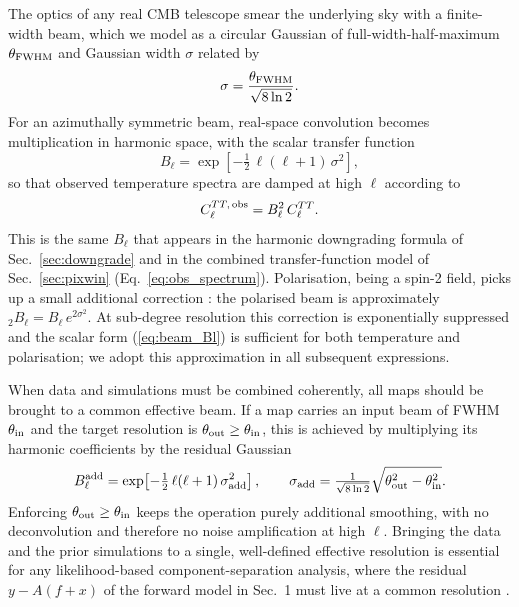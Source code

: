 \documentclass[11pt]{article}
\theoremstyle{definition}
\begin{document}
The optics of any real CMB telescope smear the underlying sky with a finite-width beam, which we model as a circular Gaussian of full-width-half-maximum \(\theta_{\rm FWHM}\) and Gaussian width \(\sigma\) related by \cite{sullivan2024methods}
\begin{equation}
  \sigma = \frac{\theta_{\rm FWHM}}{\sqrt{8\ln 2}}.
\end{equation}
For an azimuthally symmetric beam, real-space convolution becomes multiplication in harmonic space, with the scalar transfer function
\begin{equation}
  B_\ell = \exp\!\left[-\tfrac{1}{2}\,\ell(\ell+1)\,\sigma^2\right],
  \label{eq:beam_Bl}
\end{equation}
so that observed temperature spectra are damped at high \(\ell\) according to
\begin{equation}
  C_\ell^{TT,\,\rm obs} = B_\ell^2\, C_\ell^{TT}.
\end{equation}
This is the same $B_\ell$ that appears in the harmonic downgrading formula of Sec.~\ref{sec:downgrade} and in the combined transfer-function model of Sec.~\ref{sec:pixwin} (Eq.~\ref{eq:obs_spectrum}).
Polarisation, being a spin-2 field, picks up a small additional correction \cite{challinor2000beam,sullivan2024methods}: the polarised beam is approximately \({}_2 B_\ell = B_\ell\,e^{2\sigma^2}\). At sub-degree resolution this correction is exponentially suppressed and the scalar form (\ref{eq:beam_Bl}) is sufficient for both temperature and polarisation; we adopt this approximation in all subsequent expressions.

When data and simulations must be combined coherently, all maps should be brought to a common effective beam. If a map carries an input beam of FWHM \(\theta_{\rm in}\) and the target resolution is \(\theta_{\rm out}\geq\theta_{\rm in}\), this is achieved by multiplying its harmonic coefficients by the residual Gaussian
\begin{equation}
  B_\ell^{\rm add}
  = \exp\!\left[-\tfrac{1}{2}\,\ell(\ell+1)\,\sigma_{\rm add}^2\right],
  \qquad
  \sigma_{\rm add} = \tfrac{1}{\sqrt{8\ln 2}}\sqrt{\theta_{\rm out}^2-\theta_{\rm in}^2}.
  \label{eq:beam_residual}
\end{equation}
Enforcing \(\theta_{\rm out}\geq\theta_{\rm in}\) keeps the operation purely additional smoothing, with no deconvolution and therefore no noise amplification at high \(\ell\). Bringing the data and the prior simulations to a single, well-defined effective resolution is essential for any likelihood-based component-separation analysis, where the residual \(y - A(f+x)\) of the forward model in Sec.~1 must live at a common resolution \cite{sullivan2024methods}.
\end{document}
